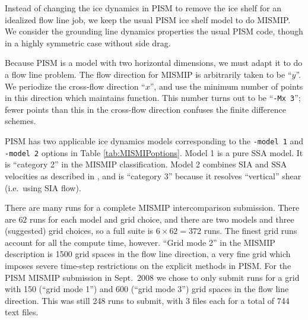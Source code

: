 \documentclass[11pt,final]{amsart}
\begin{document}
Instead of changing the ice dynamics in PISM to remove the ice shelf for an idealized flow line job, we keep the usual PISM ice shelf model to do MISMIP.  We consider the grounding line dynamics properties the usual PISM code, though in a highly symmetric case without side drag.

Because PISM is a model with two horizontal dimensions, we must adapt it to do a flow line problem.  The flow direction for MISMIP is arbitrarily taken to be ``$y$''.  We periodize the cross-flow direction ``$x$'', and use the minimum number of points in this direction which maintains function.  This number turns out to be ``\verb|-Mx 3|''; fewer points than this in the cross-flow direction confuses the finite difference schemes.

PISM has two applicable ice dynamics models corresponding to the \verb|-model 1| and \verb|-model 2| options in Table \ref{tab:MISMIPoptions}.  Model 1 is a pure SSA model.  It is ``category 2'' in the MISMIP classification.  Model 2 combines SIA and SSA velocities as described in \cite{BBssasliding}, and is ``category 3'' because it resolves ``vertical'' shear (i.e.~using SIA flow).

There are many runs for a complete MISMIP intercomparison submission.  There are $62$ runs for each model and grid choice, and there are two models and three (suggested) grid choices, so a full suite is $6 \times 62 = 372$ runs.  The finest grid runs account for all the compute time, however.  ``Grid mode 2'' in the MISMIP description is 1500 grid spaces in the flow line direction, a very fine grid which imposes severe time-step restrictions on the explicit methods in PISM.  For the PISM MISMIP submission in Sept.~2008 we chose to only submit runs for a grid with 150 (``grid mode 1'') and 600 (``grid mode 3'') grid spaces in the flow line direction.  This was still 248 runs to submit, with 3 files each for a total of 744 text files.
 
\end{document}
